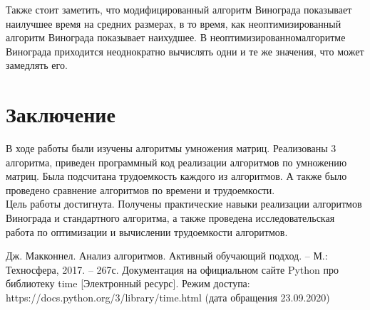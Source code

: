 \documentclass[12pt,a4paper]{report}
\begin{document}
Также стоит заметить, что модифицированный алгоритм Винограда показывает наилучшее время на средних размерах, в то 
время, как неоптимизированный алгоритм Винограда показывает наихудшее. 
В неоптимизированномалгоритме Винограда приходится неоднократно вычислять одни и те же значения, что может замедлять 
его.

\newpage
\chapter*{Заключение}

В ходе работы были изучены алгоритмы умножения матриц. 
Реализованы 3 алгоритма, приведен программный код реализации алгоритмов по умножению матриц.
Была подсчитана трудоемкость каждого из алгоритмов. 
А также было проведено сравнение алгоритмов по времени и трудоемкости.\\

Цель работы достигнута. 
Получены практические навыки реализации алгоритмов Винограда и стандартного алгоритма, а также проведена 
исследовательская работа по оптимизации и вычислении трудоемкости алгоритмов.



\newpage
\renewcommand\bibname{Список литературы}
\makeatletter %
\def\@biblabel#1{#1. }
\makeatother
\begin{thebibliography}{2}
     Дж. Макконнел. Анализ алгоритмов. Активный обучающий подход. -- М.: Техносфера, 2017. -- 267с.
     Документация на официальном сайте Python про библиотеку time [Электронный ресурс]. Режим доступа: https://docs.python.org/3/library/time.html (дата обращения 23.09.2020)
\end{thebibliography}
\end{document}
